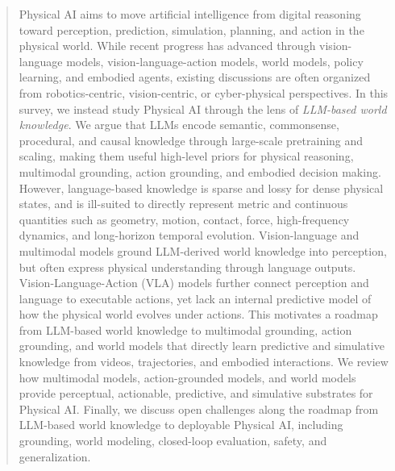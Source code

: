 \begin{abstract}
Physical AI aims to move artificial intelligence from digital reasoning toward perception, prediction, simulation, planning, and action in the physical world.
While recent progress has advanced through vision-language models, vision-language-action models, world models, policy learning, and embodied agents, existing discussions are often organized from robotics-centric, vision-centric, or cyber-physical perspectives.
In this survey, we instead study Physical AI through the lens of \emph{LLM-based world knowledge}.
We argue that LLMs encode semantic, commonsense, procedural, and causal knowledge through large-scale pretraining and scaling, making them useful high-level priors for physical reasoning, multimodal grounding, action grounding, and embodied decision making.
However, language-based knowledge is sparse and lossy for dense physical states, and is ill-suited to directly represent metric and continuous quantities such as geometry, motion, contact, force, high-frequency dynamics, and long-horizon temporal evolution.
Vision-language and multimodal models ground LLM-derived world knowledge into perception, but often express physical understanding through language outputs.
Vision-Language-Action (VLA) models further connect perception and language to executable actions, yet lack an internal predictive model of how the physical world evolves under actions.
This motivates a roadmap from LLM-based world knowledge to multimodal grounding, action grounding, and world models that directly learn predictive and simulative knowledge from videos, trajectories, and embodied interactions.
We review how multimodal models, action-grounded models, and world models provide perceptual, actionable, predictive, and simulative substrates for Physical AI.
Finally, we discuss open challenges along the roadmap from LLM-based world knowledge to deployable Physical AI, including grounding, world modeling, closed-loop evaluation, safety, and generalization.
\end{abstract}

